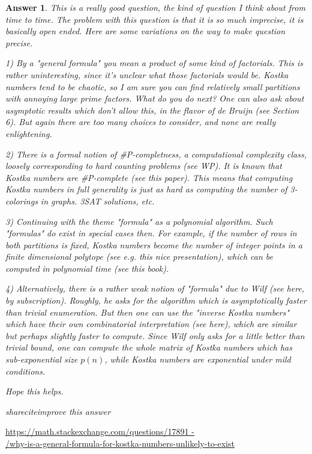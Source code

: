 \documentclass{ujarticle}[12pt,a4pepar]
\theoremstyle{jplain}
\newtheorem*{answer*}{Answer}
\begin{document}
\begin{answer*}
  This is a really good question, the kind of question I think about from time to time.
  The problem with this question is that it is so much imprecise,
  it is basically open ended. Here are some variations on the way to make question precise.

  1) By a "general formula" you mean a product of some kind of factorials.
  This is rather uninteresting, since it's unclear what those factorials would be.
  Kostka numbers tend to be chaotic,
  so I am sure you can find relatively small partitions with annoying large prime factors.
  What do you do next? One can also ask about asymptotic results which don't allow this,
  in the flavor of de Bruijn (see Section 6).
  But again there are too many choices to consider, and none are really enlightening.

  2) There is a formal notion of \#P-completness,
  a computational complexity class, loosely corresponding to hard counting problems (see WP).
  It is known that Kostka numbers are \#P-complete (see this paper).
  This means that computing Kostka numbers in full generality is just as hard as computing
  the number of 3-colorings in graphs. 3SAT solutions, etc.

  3) Continuing with the theme "formula" as a polynomial algorithm. Such "formulas"
  do exist in special cases then. For example, if the number of rows in both partitions
  is fixed, Kostka numbers become the number of integer points in a finite dimensional
  polytope (see e.g. this nice presentation), which can be computed in polynomial time
  (see this book).

  4) Alternatively, there is a rather weak notion of "formula" due to Wilf
  (see here, by subscription). Roughly, he asks for the algorithm which is asymptotically
  faster than trivial enumeration. But then one can use the "inverse Kostka numbers" which
  have their own combinatorial interpretation (see here), which are similar but perhaps slightly
  faster to compute. Since Wilf only asks for a little better than trivial bound, one can compute
  the whole matrix of Kostka numbers which has sub-exponential size $p(n)$, while Kostka numbers are
  exponential under mild conditions.

Hope this helps.

shareciteimprove this answer

\end{answer*}
\url{https://math.stackexchange.com/questions/17891 - } \\
\url{/why-is-a-general-formula-for-kostka-numbers-unlikely-to-exist}
\end{document}
